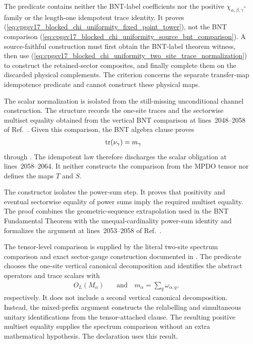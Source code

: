 \documentclass{article}
\begin{document}
The predicate
 contains neither
the BNT-label coefficients nor the positive
$\chi_{\alpha,\beta,\gamma}$-family or the length-one idempotent trace
identity. It proves
(\ref{eq:cpgsv17_blocked_chi_uniformity_fixed_point_tower}), not the BNT
comparison
(\ref{eq:cpgsv17_blocked_chi_uniformity_source_bnt_comparison}). A
source-faithful construction must first obtain the BNT-label theorem witness,
then use
(\ref{eq:cpgsv17_blocked_chi_uniformity_two_site_trace_normalization}) to
construct the retained-sector composites, and finally complete them on the
discarded physical complements. The criterion
 concerns the separate
transfer-map idempotence predicate and cannot construct these physical maps.

The scalar normalization is isolated from the still-missing unconditional
channel construction. The structure
 records the one-site
traces and the sectorwise multiset equality obtained from the vertical BNT
comparison at lines~2048--2058 of
Ref.~\cite{Cirac2016MPDO_arXiv}. Given this comparison, the BNT algebra clause
proves
\begin{align}
    \operatorname{tr}(\nu_\gamma)
        &= m_\gamma
\label{eq:cpgsv17_blocked_chi_uniformity_formal_trace_normalization}
\end{align}
through
.
The idempotent law therefore discharges the scalar obligation at
lines~2058--2064. It neither constructs the comparison from the MPDO tensor
nor defines the maps $T$ and $S$.

The constructor
isolates the power-sum step. It proves that positivity and eventual sectorwise
equality of power sums imply the required multiset equality. The proof
combines the geometric-sequence extrapolation used in the BNT Fundamental
Theorem with the unequal-cardinality power-sum identity and formalizes the
argument at lines~2053--2058 of Ref.~\cite{Cirac2016MPDO_arXiv}.

The tensor-level comparison is supplied by the literal two-site spectrum
comparison and exact sector-gauge construction documented in
. The predicate
 chooses the one-site vertical
canonical decomposition and identifies the abstract operators and trace
scalars with
\begin{align}
    O_L(M_\alpha)
        &\quad\text{and}\quad
    m_\alpha=\sum_q\omega_{\alpha,q},
\label{eq:cpgsv17_blocked_chi_uniformity_tensor_clause_identification}
\end{align}
respectively. It does not include a second vertical canonical decomposition.
Instead, the mixed-prefix argument constructs the relabelling and simultaneous
unitary identifications from the tensor-attached clause. The resulting
positive multiset equality supplies the spectrum comparison without an extra
mathematical hypothesis. The declaration
 uses this result.
\end{document}
